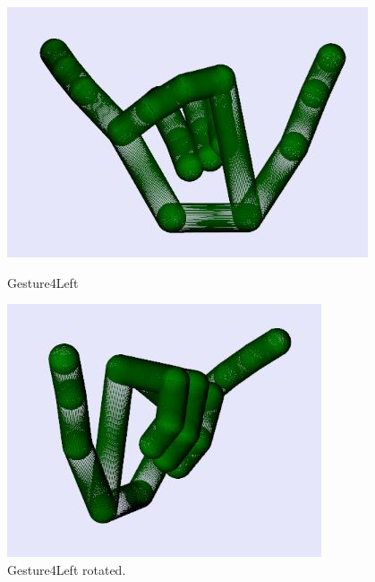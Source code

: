 \begin{figure}[H]
    \centering
    \begin{minipage}{0.5\textwidth}
        \centering
        \includegraphics[scale=.75]{Figures/gesture4Left.JPG} 
        \caption[Gesture4Left]{Gesture4Left}
		\label{fig:Gesture4Left}
    \end{minipage}\hfill
    \begin{minipage}{0.5\textwidth}
        \centering
        \includegraphics[scale=.75]{Figures/gesture4Left_rotated.JPG}
        \caption[Gesture4Left Rotated]{Gesture4Left rotated.}
        \label{fig:Gesture4Left_rotated}
    \end{minipage}
\end{figure}

